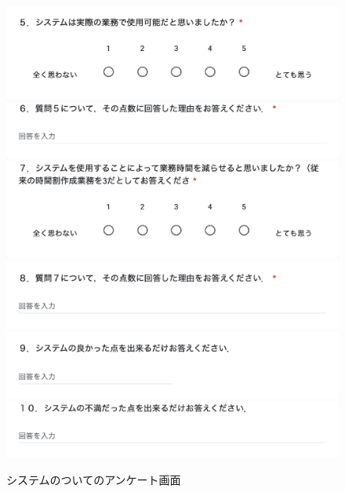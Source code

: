 \begin{figure}[htbp]
\begin{center}
\includegraphics[scale=0.5]{image/questionB/b6.eps}
\includegraphics[scale=0.5]{image/questionB/b7.eps}
\includegraphics[scale=0.5]{image/questionB/b8.eps}
\includegraphics[scale=0.5]{image/questionB/b9.eps}
\includegraphics[scale=0.5]{image/questionB/b10.eps}
\includegraphics[scale=0.5]{image/questionB/b11.eps}
\caption{システムのついてのアンケート画面}
\label{A5}
\end{center}
\end{figure}